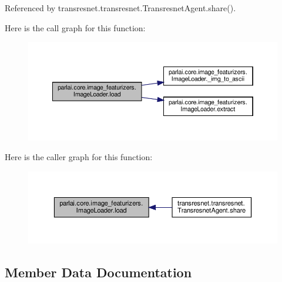 Referenced by transresnet.\+transresnet.\+Transresnet\+Agent.\+share().

Here is the call graph for this function\+:
\nopagebreak
\begin{figure}[H]
\begin{center}
\leavevmode
\includegraphics[width=350pt]{classparlai_1_1core_1_1image__featurizers_1_1ImageLoader_a40f68d29ad49a323cf50e08c6385e39e_cgraph}
\end{center}
\end{figure}
Here is the caller graph for this function\+:
\nopagebreak
\begin{figure}[H]
\begin{center}
\leavevmode
\includegraphics[width=350pt]{classparlai_1_1core_1_1image__featurizers_1_1ImageLoader_a40f68d29ad49a323cf50e08c6385e39e_icgraph}
\end{center}
\end{figure}


\subsection{Member Data Documentation}
\mbox{\label{classparlai_1_1core_1_1image__featurizers_1_1ImageLoader_ac576a1193d349be494103b6ea25449b0}} 
